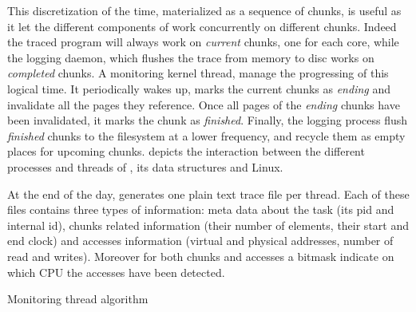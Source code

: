 This discretization of the time, materialized as a sequence of chunks, is useful as it let the
different components of \Moca work concurrently on different chunks.  Indeed the traced
program will always work on \emph{current} chunks, one for each core, while the logging daemon,
which flushes the trace from memory to disc works on \emph{completed} chunks. A
monitoring kernel thread, manage the progressing of this logical time. It periodically wakes up, marks the current chunks as
\emph{ending} and invalidate all the pages they reference. Once all pages of the \emph{ending}
chunks have been invalidated, it marks the chunk as \emph{finished}. Finally, the
logging process flush \emph{finished} chunks to the filesystem at a lower
frequency, and recycle them as empty places for upcoming chunks.   depicts the interaction between the
different processes and threads of \Moca, its data structures and Linux.

At the end of the day, \Moca generates one plain text trace file per thread. Each of these files contains three
types of information: meta data about the task (its pid and \Moca internal id),
chunks related information (their number of elements, their start and end
clock) and accesses information (virtual and physical addresses, number of read
and writes). Moreover for both chunks and accesses a bitmask indicate on which
CPU the accesses have been detected.

\begin{algorithm}[htb]
    \caption{Monitoring thread algorithm}
    \label{algo:monTh}
    \begin{algorithmic}[1]
                \State {}
                        \State {}
                        \State {}
                        \State {}
                    \EndFor
                \State {}
            \EndFor
            \State {}
        \EndWhile
    \end{algorithmic}
\end{algorithm}

